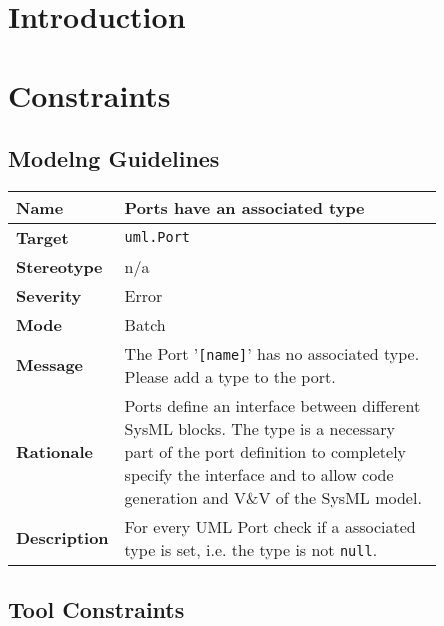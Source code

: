 \documentclass{template/openetcs_article}
\begin{document}
\tableofcontents
\listoffiguresandtables
\newpage




\section{Introduction}

\section{Constraints}
\label{sec:constraints}

\subsection{Modelng Guidelines}
\label{sec:modeling-guidelines}

\begin{longtable}{|l||>{\raggedright}p{0.85\linewidth}|}
  \hline
  \textbf{Name}        &  Ports have an associated type \tabularnewline \hline
  \textbf{Target}      &  \texttt{uml.Port} \tabularnewline \hline
  \textbf{Stereotype}  &  n/a \tabularnewline \hline
  \textbf{Severity}    &  Error \tabularnewline \hline
  \textbf{Mode}        &  Batch \tabularnewline \hline
  \textbf{Message}     &  The Port '\texttt{[name]}' has no associated type. Please add a 
                          type to the port. \tabularnewline \hline
  \textbf{Rationale}   &  Ports define an interface between different SysML blocks. The type is a necessary 
                          part of the port definition to completely specify the interface and to allow code 
                          generation and V\&V of the SysML model. \tabularnewline \hline
  \textbf{Description} &  For every UML Port check if a associated type is set, i.e. the type is not 
                          \texttt{null}. \tabularnewline \hline
\end{longtable}



\subsection{Tool Constraints}
\label{sec:tool-constraints}
\end{document}
